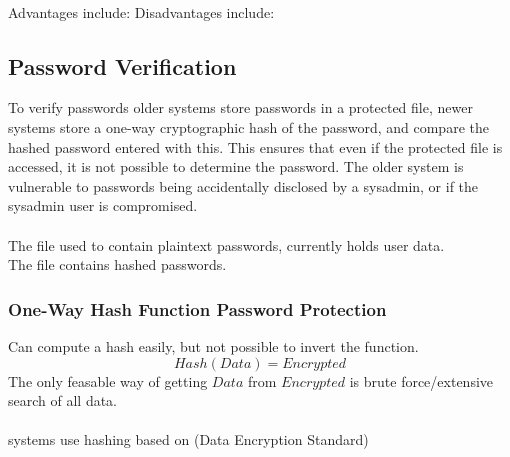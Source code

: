 \documentclass{report}
\begin{document}
{{		\\ Advantages include:
		Disadvantages include:

	}
}
\subsection*{Password Verification}
To verify passwords older systems store passwords in a protected file, newer systems store a one-way cryptographic hash of the password, and compare the hashed password entered with this. This ensures that even if the protected file is accessed, it is not possible to determine the password.
The older system is vulnerable to passwords being accidentally disclosed by a sysadmin, or if the sysadmin user is compromised.
\\
\\ The  file used to contain plaintext passwords, currently holds user data.
\\ The  file contains hashed passwords.
\subsubsection*{One-Way Hash Function Password Protection}
Can compute a hash easily, but not possible to invert the function.
\[Hash(Data) = Encrypted\]
The only feasable way of getting $Data$ from $Encrypted$ is brute force/extensive search of all data.
\\
\\  systems use hashing based on  (Data Encryption Standard)
\end{document}

